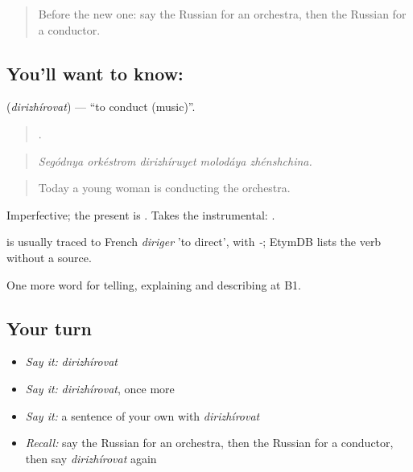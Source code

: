 \label{lesson:RU-C517-dirizhirovat}



\begin{quote}
Before the new one: say the Russian for an orchestra, then the Russian for a conductor.
\end{quote}

\subsection*{You'll want to know: }
\textbf{} (\emph{dirizhírovat}) — \textquotedblleft{}to conduct (music)\textquotedblright{}.

\begin{quote}
    .
\end{quote}

\begin{quote}
\emph{Segódnya orkéstrom dirizhíruyet molodáya zhénshchina.}
\end{quote}

\begin{quote}
Today a young woman is conducting the orchestra.
\end{quote}

Imperfective; the present is . Takes the instrumental: \emph{ }.

\begin{cousinweb}
\emph{} is usually traced to French \emph{diriger} 'to direct', with \emph{-}; EtymDB lists the verb without a source.
\end{cousinweb}

\begin{grammarlens}[title={What you've built}]
One more word for telling, explaining and describing at B1.
\end{grammarlens}

\subsection*{Your turn}
\begin{itemize}
\raggedright
  \item \emph{Say it:} \emph{dirizhírovat}
  \item \emph{Say it:} \emph{dirizhírovat}, once more
  \item \emph{Say it:} a sentence of your own with \emph{dirizhírovat}
  \item \emph{Recall:} say the Russian for an orchestra, then the Russian for a conductor, then say \emph{dirizhírovat} again
\end{itemize}


